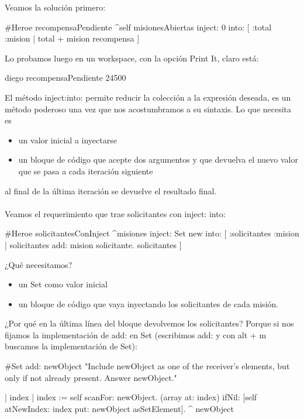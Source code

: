 \documentclass[a4paper,12pt]{book}
\begin{document}
Veamos la solución primero:

\begin{code}
#Heroe
recompensaPendiente
   ^self misionesAbiertas 
         inject: 0 
	 into: [ :total :mision | total + mision recompensa ]
\end{code}

Lo probamos luego en un workspace, con la opción Print It, claro está:

\begin{code}
diego recompensaPendiente
  24500
\end{code}

El método inject:into: permite reducir la colección a la expresión deseada, es un método poderoso una vez que
nos acostumbramos a su sintaxis. Lo que necesita es

\begin{itemize}
 \item un valor inicial a inyectarse 
 \item un bloque de código que acepte dos argumentos y que devuelva el nuevo valor que se pasa a cada iteración siguiente
\end{itemize}

al final de la última iteración se devuelve el resultado final.
\\
\\
Veamos el requerimiento que trae solicitantes con inject: into:

\begin{code}
#Heroe
solicitantesConInject
   ^misiones inject: Set new 
             into: [ :solicitantes :mision | 
	             solicitantes add: mision solicitante. 
	             solicitantes  ] 
\end{code}

¿Qué necesitamos?
\\
\begin{itemize}
 \item un Set como valor inicial
 \item un bloque de código que vaya inyectando los solicitantes de cada misión. 
\end{itemize}

¿Por qué en la última línea del bloque devolvemos los solicitantes? Porque si nos fijamos la implementación de
add: en Set (escribimos add: y con alt + m buscamos la implementación de Set):

\begin{code}
#Set
add: newObject
	"Include newObject as one of the receiver's elements, but only if
	not already present. Answer newObject."

	| index |
	index := self scanFor: newObject.
	(array at: index) ifNil: [self atNewIndex: index put: newObject asSetElement].
	^ newObject
\end{code}
\end{document}
